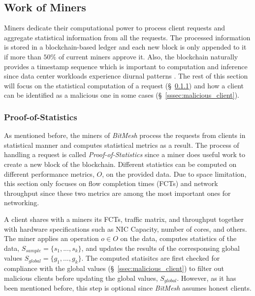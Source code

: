 \documentclass[11px]{article}
\newcommand{\projTitle}{BitMesh\xspace}
\begin{document}
\subsection{Work of Miners}\label{ssec:work_of_miners}
Miners dedicate their computational power to process client requests and aggregate statistical information from all the requests. The processed information is stored in a blockchain-based ledger and each new block is only appended to it if more than $50\%$ of current miners approve it. Also, the blockchain naturally provides a timestamp sequence which is important to computation and inference since data center workloads experience diurnal patterns \cite{diurnal_pattern_data_center_1, diurnal_pattern_data_center_2}. The rest of this section will focus on the statistical computation of a request (\S\ \ref{sssec:proof_of_statistics}) and how a client can be identified as a malicious one in some cases (\S\ \ref{sssec:malicious_client}).

\subsubsection{Proof-of-Statistics}\label{sssec:proof_of_statistics}
As mentioned before, the miners of \textit{\projTitle} process the requests from clients in statistical manner and computes statistical metrics as a result. The process of handling a request is called \textit{Proof-of-Statistics} since a miner does useful work to create a new block of the blockchain. Different statistics can be  computed on different performance metrics, $O$, on the provided data. Due to space limitation, this section only focuses on flow completion times (FCTs) and network throughput since these two metrics are among the most important ones for networking.

\noindent \newline A client shares with a miners its FCTs, traffic matrix, and throughput together with hardware specifications such as NIC Capacity, number of cores, and others. The miner applies an operation $o \in O$ on the data, computes statistics of the data, $S_{sample} = \{s_1, ..., s_k\}$, and updates the results of the corresponsing global values $S_{global} = \{g_1, ..., g_k\}$.
The computed statisitcs are first checked for compliance with the global values (\S\ \ref{ssec:malicious_client}) to filter out malicious clients before updating the global values, $S_{global}$. However, as it has been mentioned before, this step is optional since \textit{\projTitle} assumes honest clients.
\end{document}
